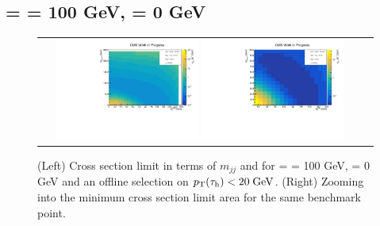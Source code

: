 \subsection*{\charginopm = \neutralinotwo = 100 GeV, \neutralinoone = 0 GeV}

\begin{figure}[tbh!]
	\centering
	\begin{tabular}{cc}
		\includegraphics[width=0.45\textwidth]{analysis/pics/JetInvMass_vs_MET_xsec_chi100_lsp000_taupt20.pdf}
		\includegraphics[width=0.45\textwidth]{analysis/pics/JetInvMass_vs_MET_xsec_chi100_lsp000_taupt20_zoom.pdf} 		
	\end{tabular}
	\caption{(Left) Cross section limit in terms of $m_{jj}$ and \met for \charginopm = \neutralinotwo = 100 GeV, \neutralinoone = 0 GeV and an offline selection on $p_{\text{T}}(\tau_{\text{h}}) <  20\;\text{Ge}\kern-0.06667em\text{V}$. (Right) Zooming into the minimum cross section limit area for the same benchmark point.}
	\label{fig::JetInvMass_vs_MET_xsec_chi100_lsp000_taupt20}
\end{figure}

